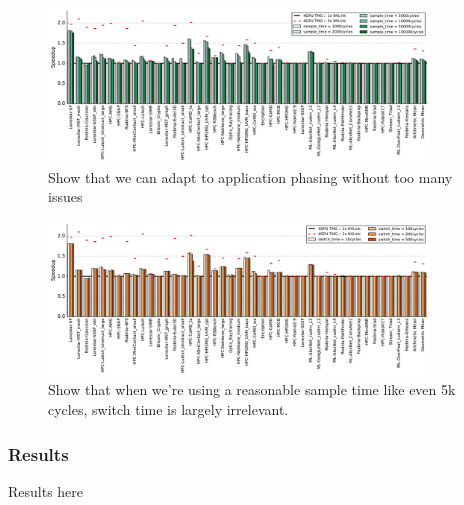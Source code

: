 \begin{figure}[tp]
    \centering
    \includegraphics[width=0.9\textwidth]{figures/plot_nvlink_sample_time.pdf}
    \caption{Show that we can adapt to application phasing without too many 
issues}
    \label{fig:sampletime}
\end{figure}


\begin{figure}[tp]
    \centering
    \includegraphics[width=0.9\textwidth]{figures/plot_nvlink_switch_time_sample_time5000.pdf}
    \caption{Show that when we're using a reasonable sample time like even 5k 
cycles, switch time is largely irrelevant.}
    \label{fig:switchtime}
\end{figure}

\subsubsection{Results}
Results here
